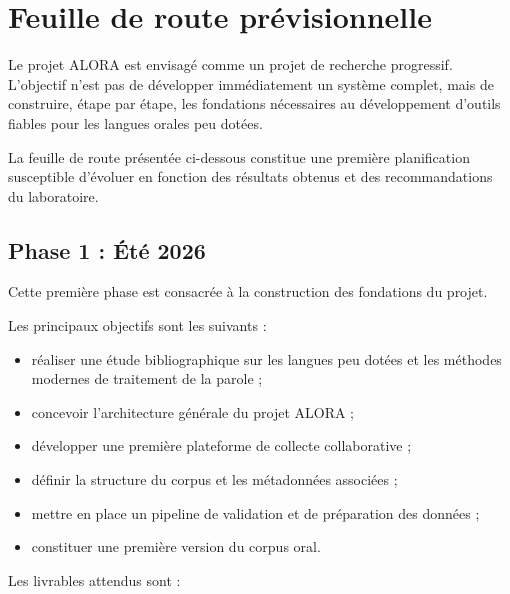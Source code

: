 \section{Feuille de route prévisionnelle}

Le projet ALORA est envisagé comme un projet de recherche progressif.
L'objectif n'est pas de développer immédiatement un système complet, mais
de construire, étape par étape, les fondations nécessaires au
développement d'outils fiables pour les langues orales peu dotées.

La feuille de route présentée ci-dessous constitue une première
planification susceptible d'évoluer en fonction des résultats obtenus et
des recommandations du laboratoire.


\subsection{Phase 1 : Été 2026}

Cette première phase est consacrée à la construction des fondations du
projet.

Les principaux objectifs sont les suivants :

\begin{itemize}

\item réaliser une étude bibliographique sur les langues peu dotées et
les méthodes modernes de traitement de la parole ;

\item concevoir l'architecture générale du projet ALORA ;

\item développer une première plateforme de collecte collaborative ;

\item définir la structure du corpus et les métadonnées associées ;

\item mettre en place un pipeline de validation et de préparation des
données ;

\item constituer une première version du corpus oral.

\end{itemize}

Les livrables attendus sont :

